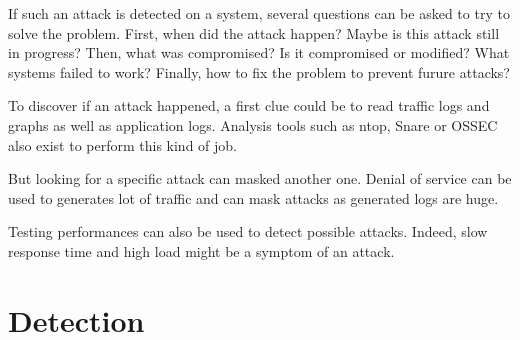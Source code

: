 If such an attack is detected on a system, several questions can be asked to
try to solve the problem. First, when did the attack happen? Maybe is this
attack still in progress? Then, what was compromised? Is it compromised or
modified? What systems failed to work? Finally, how to fix the problem to
prevent furure attacks?

To discover if an attack happened, a first clue could be to read traffic logs
and graphs as well as application logs.
Analysis tools such as ntop, Snare or OSSEC also exist to perform this kind of
job.

But looking for a specific attack can masked another one. Denial of service
can be used to generates lot of traffic and can mask attacks as generated logs
are huge.

Testing performances can also be used to detect possible attacks. Indeed, slow
response time and high load might be a symptom of an attack.

\section{Detection}

